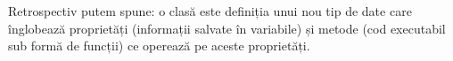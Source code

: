 Retrospectiv putem spune: o clasă este definiția unui nou tip de date
care înglobează proprietăți (informații salvate în variabile) și
metode (cod executabil sub formă de funcții) ce operează pe aceste
proprietăți.





% 
% 
% 
